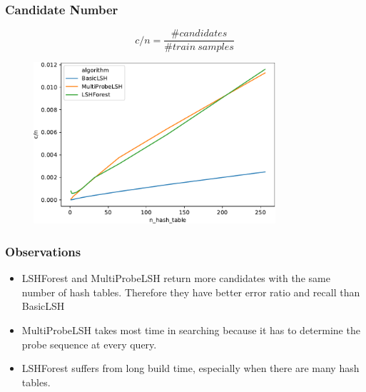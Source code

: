 \begin{frame}
\frametitle{Candidate Number}
\vspace{-1em}
$$
c/n=\frac{\# candidates}{\# train\ samples}
$$
\vspace{-1em}
\begin{figure}
\includegraphics[width=0.8\textwidth]{figures/c_n}
\end{figure}
\end{frame}

\begin{frame}
\frametitle{Observations}
\begin{itemize}
	\item LSHForest and MultiProbeLSH return more candidates with the same number of hash tables. Therefore they have better error ratio and recall than BasicLSH
	\item MultiProbeLSH takes most time in searching because it has to determine the probe sequence at every query.
	\item LSHForest suffers from long build time, especially when there are many hash tables.
\end{itemize}	
\end{frame}


